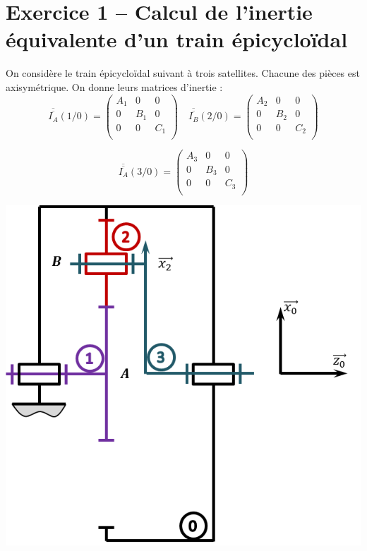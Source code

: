 \documentclass[10pt,fleqn]{article} %
\begin{document}

\vspace{10cm}
\pagestyle{fancy}
\thispagestyle{plain}


\def\columnseprulecolor{\color{ocre}}
\setlength{\columnseprule}{0.4pt} 


\section*{Exercice 1 -- Calcul de l'inertie équivalente d'un train épicycloïdal}
\setcounter{subparagraph}{0}

On considère le train épicycloïdal suivant à trois satellites. Chacune des pièces est axisymétrique. On donne leurs matrices d'inertie :
$$
\overline{\overline{I_A}}(1/0) = 
\begin{pmatrix} 
A_1 & 0 & 0 \\
0 & B_1 & 0 \\
0 & 0 & C_1 \\
\end{pmatrix}
\quad
\overline{\overline{I_B}}(2/0) = 
\begin{pmatrix} 
A_2 & 0 & 0 \\
0 & B_2 & 0 \\
0 & 0 & C_2 \\
\end{pmatrix}
$$

$$
\overline{\overline{I_A}}(3/0) = 
\begin{pmatrix} 
A_3 & 0 & 0 \\
0 & B_3 & 0 \\
0 & 0 & C_3 \\
\end{pmatrix}
$$

\begin{center}
\includegraphics[width=.45\textwidth]{images/train_01}
\end{center}
\end{document}
